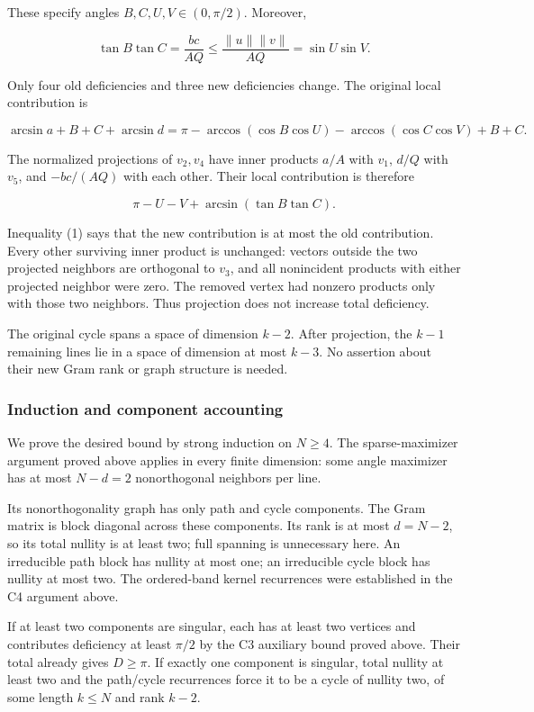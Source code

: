 \documentclass[11pt,a4paper]{article}
\begin{document}
These specify angles \(B,C,U,V\in(0,\pi/2)\). Moreover,

\[
\tan B\tan C=\frac{bc}{AQ}\le\frac{\|u\|\|v\|}{AQ}=\sin U\sin V.
\]

Only four old deficiencies and three new deficiencies change. The original local contribution is

\[
\arcsin a+B+C+\arcsin d=\pi-\arccos(\cos B\cos U)-\arccos(\cos C\cos V)+B+C.
\]

The normalized projections of \(v_2,v_4\) have inner products \(a/A\) with \(v_1\), \(d/Q\) with \(v_5\), and \(-bc/(AQ)\) with each other. Their local contribution is therefore

\[
\pi-U-V+\arcsin(\tan B\tan C).
\]

Inequality (1) says that the new contribution is at most the old contribution. Every other surviving inner product is unchanged: vectors outside the two projected neighbors are orthogonal to \(v_3\), and all nonincident products with either projected neighbor were zero. The removed vertex had nonzero products only with those two neighbors. Thus projection does not increase total deficiency.

The original cycle spans a space of dimension \(k-2\). After projection, the \(k-1\) remaining lines lie in a space of dimension at most \(k-3\). No assertion about their new Gram rank or graph structure is needed.

\subsubsection{Induction and component accounting}\label{induction-and-component-accounting}

We prove the desired bound by strong induction on \(N\ge4\). The sparse-maximizer argument proved above applies in every finite dimension: some angle maximizer has at most \(N-d=2\) nonorthogonal neighbors per line.

Its nonorthogonality graph has only path and cycle components. The Gram matrix is block diagonal across these components. Its rank is at most \(d=N-2\), so its total nullity is at least two; full spanning is unnecessary here. An irreducible path block has nullity at most one; an irreducible cycle block has nullity at most two. The ordered-band kernel recurrences were established in the C4 argument above.

If at least two components are singular, each has at least two vertices and contributes deficiency at least \(\pi/2\) by the C3 auxiliary bound proved above. Their total already gives \(D\ge\pi\). If exactly one component is singular, total nullity at least two and the path/cycle recurrences force it to be a cycle of nullity two, of some length \(k\le N\) and rank \(k-2\).
\end{document}
